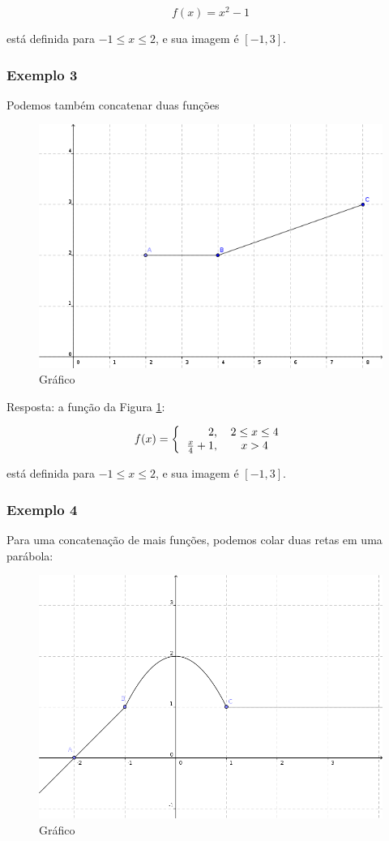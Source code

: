 \documentclass[a4paper]{article}
\begin{document}
\begin{displaymath}
  f(x) = x^2-1
\end{displaymath}

está definida para $-1 \le x \le 2$, e sua imagem é $[-1,3]$.

\subsubsection{Exemplo 3}

Podemos também concatenar duas funções

\begin{figure}[h!]
  \centering
  \includegraphics[width=.65\textwidth]{2retas} 
  \caption{Gráfico}
  \label{fig:2retas}
\end{figure}

Resposta: a função da Figura \ref{fig:2retas}:

\begin{displaymath}
  f(x) =   \left\{\begin{tabular}[h]{rc}
                    $2$, & $2 \le x \le 4$\\
                    $\frac{x}{4}+1$, & $x>4$\\
                  \end{tabular}\right.
                \end{displaymath}

está definida para $-1 \le x \le 2$, e sua imagem é $[-1,3]$.

\subsubsection{Exemplo 4}

Para uma concatenação de mais funções, podemos colar duas retas em uma parábola:

\begin{figure}[h!]
  \centering
  \includegraphics[width=.65\textwidth]{2retas+parabola}
  \caption{Gráfico}
  \label{fig:2retas+parabola}
\end{figure}
\end{document}
